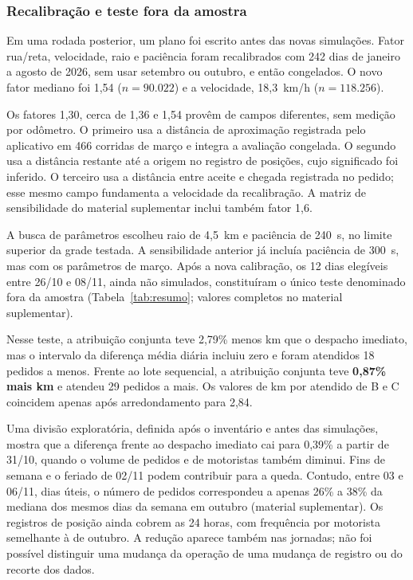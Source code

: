 \subsubsection*{Recalibração e teste fora da amostra}

Em uma rodada posterior, um plano foi escrito antes das novas simulações. Fator rua/reta, velocidade, raio e paciência foram recalibrados com 242 dias de janeiro a agosto de 2026, sem usar setembro ou outubro, e então congelados. O novo fator mediano foi 1,54 ($n=90.022$) e a velocidade, 18,3~km/h ($n=118.256$).

Os fatores 1,30, cerca de 1,36 e 1,54 provêm de campos diferentes, sem medição por odômetro. O primeiro usa a distância de aproximação registrada pelo aplicativo em 466 corridas de março e integra a avaliação congelada. O segundo usa a distância restante até a origem no registro de posições, cujo significado foi inferido. O terceiro usa a distância entre aceite e chegada registrada no pedido; esse mesmo campo fundamenta a velocidade da recalibração. A matriz de sensibilidade do material suplementar inclui também fator 1,6.

A busca de parâmetros escolheu raio de 4,5~km e paciência de 240~s, no limite superior da grade testada. A sensibilidade anterior já incluía paciência de 300~s, mas com os parâmetros de março. Após a nova calibração, os 12 dias elegíveis entre 26/10 e 08/11, ainda não simulados, constituíram o único teste denominado fora da amostra (Tabela~\ref{tab:resumo}; valores completos no material suplementar).

Nesse teste, a atribuição conjunta teve 2,79\% menos km que o despacho imediato, mas o intervalo da diferença média diária incluiu zero e foram atendidos 18 pedidos a menos. Frente ao lote sequencial, a atribuição conjunta teve \textbf{0,87\% mais km} e atendeu 29 pedidos a mais. Os valores de km por atendido de B e C coincidem apenas após arredondamento para 2,84.

Uma divisão exploratória, definida após o inventário e antes das simulações, mostra que a diferença frente ao despacho imediato cai para 0,39\% a partir de 31/10, quando o volume de pedidos e de motoristas também diminui. Fins de semana e o feriado de 02/11 podem contribuir para a queda. Contudo, entre 03 e 06/11, dias úteis, o número de pedidos correspondeu a apenas 26\% a 38\% da mediana dos mesmos dias da semana em outubro (material suplementar). Os registros de posição ainda cobrem as 24 horas, com frequência por motorista semelhante à de outubro. A redução aparece também nas jornadas; não foi possível distinguir uma mudança da operação de uma mudança de registro ou do recorte dos dados.

